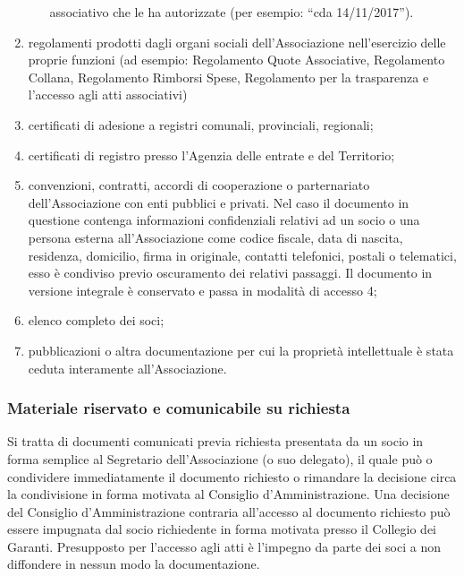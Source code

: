 \begin{enumerate}
\begin{itemize}
                associativo che le ha autorizzate (per esempio: ``cda
                14/11/2017'').
        \end{itemize}
    \item regolamenti prodotti dagli organi sociali dell’Associazione nell’esercizio delle proprie funzioni (ad esempio: Regolamento Quote Associative, Regolamento Collana, Regolamento Rimborsi Spese, Regolamento per la trasparenza e l’accesso agli atti associativi) 
    \item certificati di adesione a registri comunali, provinciali, regionali;
    \item certificati di registro presso l’Agenzia delle entrate e del Territorio;
    \item convenzioni, contratti, accordi di cooperazione o parternariato
        dell’Associazione con enti pubblici e privati. Nel caso il documento
        in questione contenga informazioni confidenziali relativi ad un
        socio o una persona esterna all’Associazione come codice fiscale,
        data di nascita, residenza, domicilio, firma in originale, contatti
        telefonici, postali o telematici, esso è condiviso previo
        oscuramento dei relativi passaggi. Il documento in versione
        integrale è conservato e passa in modalità di accesso 4; 
    \item elenco completo dei soci; 
    \item pubblicazioni o altra documentazione per cui la proprietà intellettuale è stata ceduta interamente all’Associazione.
\end{enumerate}

\subsubsection{Materiale riservato e comunicabile su
richiesta}\label{materiale-riservato-e-comunicabile-su-richiesta}

Si tratta di documenti comunicati previa richiesta presentata da un socio in forma semplice al Segretario dell’Associazione (o suo delegato), il quale può o condividere immediatamente il documento richiesto o rimandare la decisione circa la condivisione in forma motivata al Consiglio d’Amministrazione. Una decisione del Consiglio d’Amministrazione contraria all’accesso al documento richiesto può essere impugnata dal socio richiedente in forma motivata presso il Collegio dei Garanti. Presupposto per l’accesso agli atti è l’impegno da parte dei soci a non diffondere in nessun modo la documentazione.  

